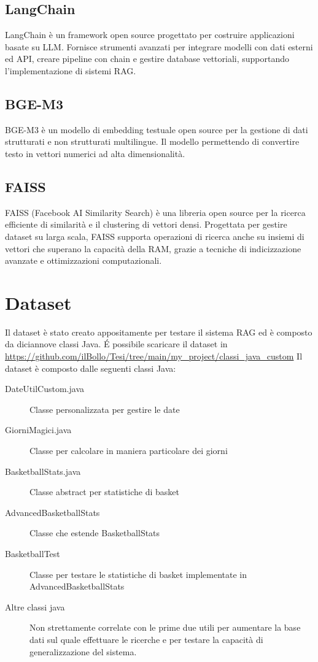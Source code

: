 \documentclass[12pt,a4paper,openright,twoside]{book}
\begin{document}
\subsection{LangChain}
LangChain \cite{langchain} è un framework open source progettato per costruire applicazioni basate su LLM.
Fornisce strumenti avanzati per integrare modelli con dati esterni ed API, creare pipeline con chain
e gestire database vettoriali, supportando l'implementazione di sistemi RAG.

\subsection{BGE-M3}
BGE-M3 \cite{bge-m3} è un modello di embedding testuale open source per la gestione di dati strutturati e non strutturati multilingue.
Il modello permettendo di convertire testo in vettori numerici ad alta dimensionalità.

\subsection{FAISS}
FAISS (Facebook AI Similarity Search) \cite{faiss} è una libreria open source per la ricerca efficiente di similarità e il clustering di vettori densi.
Progettata per gestire dataset su larga scala, FAISS supporta operazioni di ricerca anche su insiemi di vettori che superano la capacità della RAM, grazie a tecniche di indicizzazione avanzate e ottimizzazioni computazionali.

\section{Dataset}
Il dataset è stato creato appositamente per testare il sistema RAG ed è composto da diciannove classi Java.
\'E possibile scaricare il dataset in \url{https://github.com/ilBollo/Tesi/tree/main/my_project/classi_java_custom}
Il dataset è composto dalle seguenti classi Java: 
\begin{description}
    \item[DateUtilCustom.java] Classe personalizzata per gestire le date
    \item[GiorniMagici.java] Classe per calcolare in maniera particolare dei giorni
    \item[BasketballStats.java] Classe abstract per statistiche di basket
    \item[AdvancedBasketballStats] Classe che estende BasketballStats
    \item[BasketballTest] Classe per testare le statistiche di basket implementate in AdvancedBasketballStats
    \item[Altre classi java] Non strettamente correlate con le prime due utili per aumentare la base dati sul quale effettuare le ricerche e per testare la capacità di generalizzazione del sistema.
\end{description}
\end{document}
